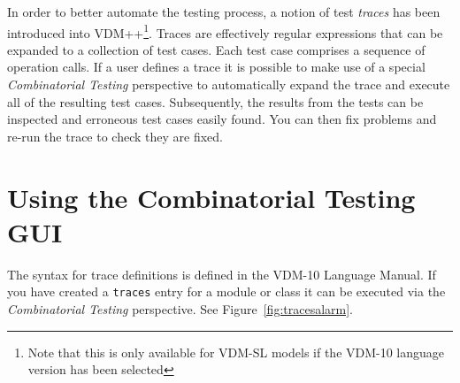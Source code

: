\documentclass{overturerepchap}
\begin{document}
In order to better automate the testing process, a notion of
test \emph{traces} has been introduced into VDM++\footnote{Note that this is 
only available for VDM-SL models if the VDM-10 language version has been selected}. 
Traces are effectively regular expressions that can be expanded to a collection of test
cases. Each test case comprises a sequence of operation
calls. If a user defines a trace it is possible to make use of a
special \emph{Combinatorial Testing} perspective to automatically
expand the trace and execute all of the resulting test
cases. Subsequently, the results from the tests can be inspected
and erroneous test cases easily found. You can then fix 
problems and re-run the trace to check they are fixed.

\section{Using the Combinatorial Testing GUI}

The syntax for trace definitions is defined in the VDM-10 Language
Manual.
If you have created a \texttt{traces} entry for a module or class it
can be executed via the \emph{Combinatorial Testing}
perspective. See
Figure~\ref{fig:tracesalarm}.
\end{document}
